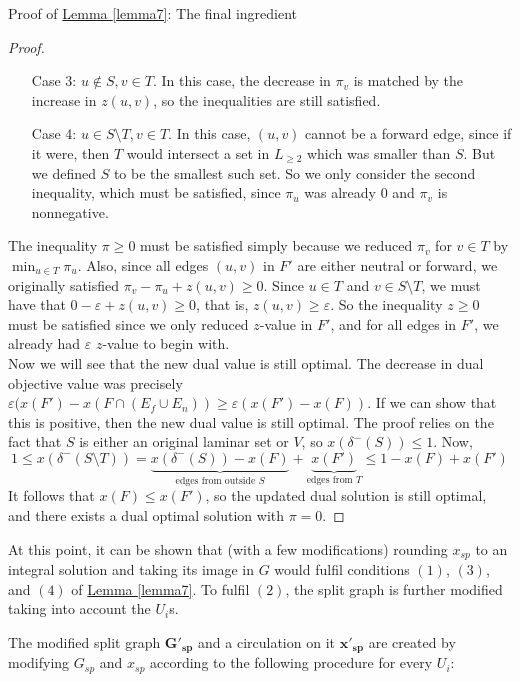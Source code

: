 \documentclass[./main.tex]{subfiles}
\begin{document}
\begin{subsection}{Proof of \hyperref[lemma7]{Lemma \ref{lemma7}}: The final ingredient}
\begin{proof}
\begin{itemize}
		\item[Case 3:] $u\notin S, v\in T$. In this case, the decrease in $\pi_v$ is matched by the increase in $z(u,v)$, so the inequalities are still satisfied.
		\item[Case 4:] $u\in S\setminus T, v\in T$. In this case, $(u,v)$ cannot be a forward edge, since if it were, then $T$ would intersect a set in $L_{\geq 2}$ which was smaller than $S$. But we defined $S$ to be the smallest such set. So we only consider the second inequality, which must be satisfied, since $\pi_u$ was already $0$ and $\pi_v$ is nonnegative.
		\end{itemize}
		The inequality $\pi\geq 0$ must be satisfied simply because we reduced $\pi_v$ for $v\in T$ by $\min_{u\in T}\pi_u$. 
		Also, since all edges $(u,v)$ in $F'$ are either neutral or forward, we originally satisfied $\pi_v - \pi_u + z(u,v)\geq 0$. Since $u\in T$ and $v\in S\setminus T$, we must have that $0 - \varepsilon + z(u,v)\geq 0$, that is, $z(u,v)\geq \varepsilon$. 
So the inequality $z\geq 0$ must be satisfied since we only reduced $z$-value in $F'$, and for all edges in $F'$, we already had $\varepsilon$ $z$-value to begin with.\vspace{2mm}
\\Now we will see that the new dual value is still optimal. 
The decrease in dual objective value was precisely $\varepsilon (x(F') - x(F\cap( E_f\cup E_n))\geq \varepsilon(x(F') - x(F))$. If we can show that this is positive, then the new dual value is still optimal. The proof relies on the fact that $S$ is either an original laminar set or $V$, so $x(\delta^-(S))\leq 1$. Now, $$1\leq x(\delta^-(S\setminus T)) = \underbrace{x(\delta^-(S)) - x(F)}_{\text{edges from outside } S} + \underbrace{x(F')}_{\text{edges from } T}\leq 1 - x(F) + x(F')$$
It follows that $x(F)\leq x(F')$, so the updated dual solution is still optimal, and there exists a dual optimal solution with $\pi = 0$.
	\end{proof}
	At this point, it can be shown that (with a few modifications) rounding $x_{sp}$ to an integral solution and taking its image in $G$ would fulfil conditions $(1)$, $(3)$, and $(4)$ of \hyperref[lemma7]{Lemma \ref{lemma7}}. To fulfil $(2)$, the split graph is further modified taking into account the $U_i$s.\vspace{2mm}
	\begin{definition}\label{def:6.1}
		The modified split graph $\bm{G'_{sp}}$ and a circulation on it $\bm{x'_{sp}}$ are created by modifying $G_{sp}$ and $x_{sp}$ according to the following procedure for every $U_i$:

\end{definition}
\end{subsection}
\end{document}
